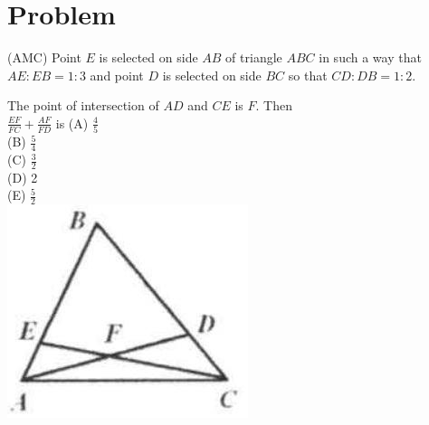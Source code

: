 \documentclass{article}
\begin{document}
\section*{Problem}
(AMC) Point \(E\) is selected on side \(A B\) of triangle \(A B C\) in such a way that \(A E: E B=1: 3\) and point \(D\) is selected on side \(B C\) so that \(C D: D B=1: 2\).


The point of intersection of \(A D\) and \(C E\) is \(F\). Then\\
\(\frac{E F}{F C}+\frac{A F}{F D}\) is (A) \(\frac{4}{5}\)\\
(B) \(\frac{5}{4}\)\\
(C) \(\frac{3}{2}\)\\
(D) 2\\
(E) \(\frac{5}{2}\)\\
\centering
\includegraphics[width=\textwidth]{images/127.jpg}
\end{document}
